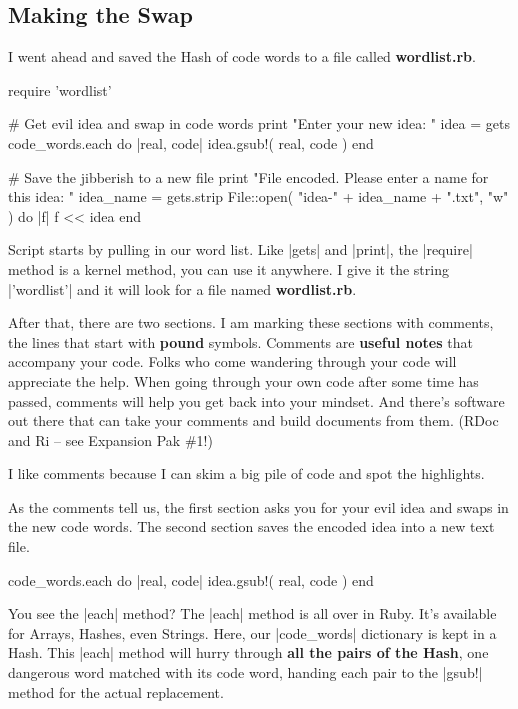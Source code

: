 \documentclass[12pt,twoside]{report}
\begin{document}
\subsection{Making the Swap}



I went ahead and saved the Hash of code words to a file called {\bf
  wordlist.rb}.


\begin{rubycode}

 require 'wordlist'

 # Get evil idea and swap in code words
 print "Enter your new idea: "
 idea = gets
 code_words.each do |real, code|
   idea.gsub!( real, code )
 end

 # Save the jibberish to a new file
 print "File encoded.  Please enter a name for this idea: "
 idea_name = gets.strip
 File::open( "idea-" + idea_name + ".txt", "w" ) do |f|
   f << idea
 end

\end{rubycode}

Script starts by pulling in our word list.  Like
\rubyinline|gets| and
\rubyinline|print|, the
\rubyinline|require| method is a kernel method, you
can use it anywhere.  I give it the string
\rubyinline|'wordlist'| and it will look for a file
named {\bf wordlist.rb}.

After that, there are two sections.  I am marking these sections with
comments, the lines that start with {\bf pound} symbols.  Comments are
{\bf useful notes} that accompany your code.  Folks who come wandering
through your code will appreciate the help.  When going through your
own code after some time has passed, comments will help you get back
into your mindset.  And there's software out there that can take your
comments and build documents from them.  (RDoc and Ri -- see Expansion
Pak \#1!)

I like comments because I can skim a big pile of code and spot the
highlights.

As the comments tell us, the first section asks you for your evil idea
and swaps in the new code words.  The second section saves the encoded
idea into a new text file.


\begin{rubycode}

 code_words.each do |real, code|
   idea.gsub!( real, code )
 end

\end{rubycode}

You see the \rubyinline|each| method?  The
\rubyinline|each| method is all over in Ruby.  It's
available for Arrays, Hashes, even Strings.  Here, our
\rubyinline|code_words| dictionary is kept in a Hash.
This \rubyinline|each| method will hurry through {\bf
  all the pairs of the Hash}, one dangerous word matched with its code
word, handing each pair to the \rubyinline|gsub!|
method for the actual replacement.
\end{document}
